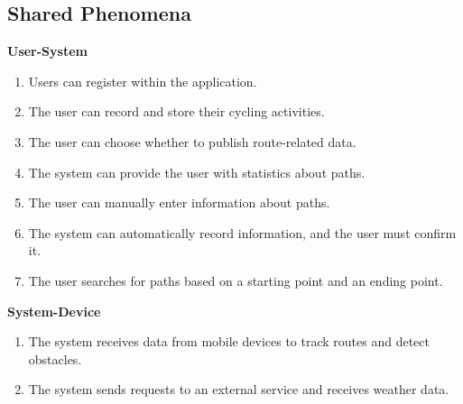 \subsection{Shared Phenomena}
\textbf{User-System}
\begin{enumerate}[label=SP\arabic*.]
    \item Users can register within the application.
    \item The user can record and store their cycling activities.
    \item The user can choose whether to publish route-related data.
    \item The system can provide the user with statistics about paths.
    \item The user can manually enter information about paths.
    \item The system can automatically record information, and the user must confirm it.
    \item The user searches for paths based on a starting point and an ending point.
\end{enumerate}
\textbf{System-Device}
\begin{enumerate}[label=SP\arabic*., resume]
    \item The system receives data from mobile devices to track routes and detect obstacles.
    \item The system sends requests to an external service and receives weather data.
\end{enumerate}